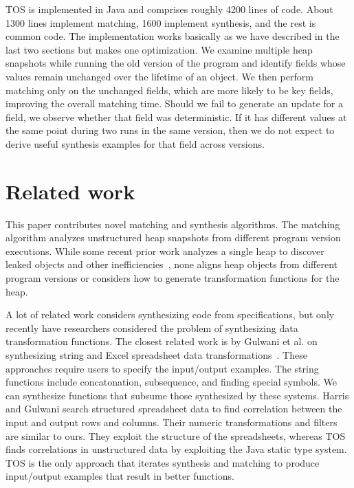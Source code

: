 \documentclass[natbib]{sigplanconf}
\newcommand{\TOS}{TOS\xspace}
\newcommand{\mwh}[1]{\textcolor{blue}{Mike: #1}}
\begin{document}
\TOS is implemented in Java and comprises roughly 4200 lines
of code. About 1300 lines implement matching, 1600 implement
synthesis, and the rest is common code.  The implementation works basically as we
have described in the last two sections but makes one optimization.
We examine multiple heap snapshots while running the old version of
the program and identify fields whose values remain unchanged over the
lifetime of an object.  We then perform matching only on the unchanged
fields, which are more likely to be key fields, improving the overall
matching time.  Should we fail to generate an update for a field, we 
observe whether that field was deterministic.  If it has
different values at the same point during two runs in the same
version, then we do not expect to derive useful synthesis examples
for that field across versions.






\section{Related work}


This paper contributes novel matching and synthesis algorithms. The
matching algorithm analyzes unstructured heap snapshots from different
program version executions.  While some recent prior work analyzes a
single heap to discover leaked objects and other
inefficiencies~\cite{BM:06,BM:09,JM:07,MS:03,MS:07,XR:10}, none aligns
heap objects from different program versions or considers how to
generate transformation functions for the heap.  

A lot of related work
considers synthesizing code from specifications, but only recently
have researchers considered the problem of synthesizing data
transformation functions.  The closest related work is by Gulwani et
al. on synthesizing string and Excel spreadsheet data
transformations~\cite{Gulwani:popl:2011,Gulwani:pldi:2011}.  These
approaches require users to specify the input/output examples.  The
string functions include concatonation, subsequence, and finding
special symbols.  We can synthesize functions that subsume those
synthesized by these systems. 
Harris and Gulwani search structured spreadsheet data to find
correlation between the input and output rows and columns.  Their
numeric transformations and filters are similar to ours. They exploit
the structure of the spreadsheets, whereas \TOS finds correlations in
unstructured data by exploiting the Java static type system. \TOS is
the only approach that iterates synthesis and matching to produce
input/output examples that result in better functions.
\end{document}
